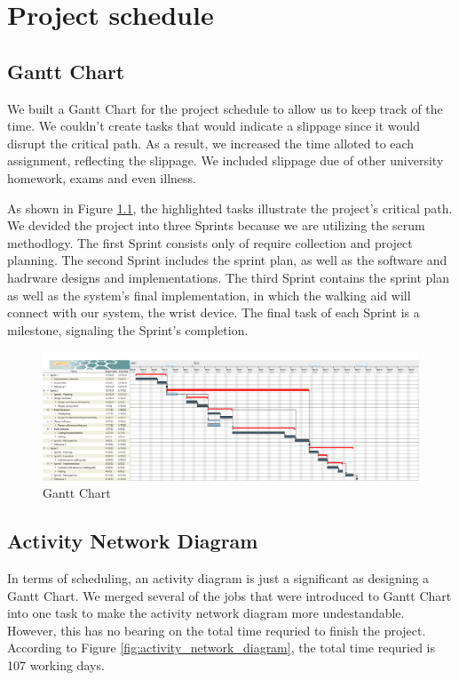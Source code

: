 \chapter{Project schedule}\label{ch:schedule}
    \section{Gantt Chart}

    We built a Gantt Chart for the project schedule to allow us to keep track of the time. We couldn't create tasks that would indicate a slippage since it would disrupt the critical path. As a result, we increased the time alloted to each assignment, reflecting the slippage. We included slippage due of other university homework, exams and even illness.

    As shown in Figure \ref{fig:gantt_chart}, the highlighted tasks illustrate the project's critical path. We devided the project into three Sprints because we are utilizing the scrum methodlogy. The first Sprint consists only of require collection and project planning. The second Sprint includes the sprint plan, as well as the software and hadrware designs and implementations. The third Sprint contains the sprint plan as well as the system's final implementation, in which the walking aid will connect with our system, the wrist device. The final task of each Sprint is a milestone, signaling the Sprint's completion.

    \begin{figure}[H]
      \includegraphics[width=\linewidth]{graphics/Gantt_Chart.png}
      \caption{Gantt Chart}
      \label{fig:gantt_chart}
    \end{figure}

    \section{Activity Network Diagram}

    In terms of scheduling, an activity diagram is just a significant as designing a Gantt Chart. We merged several of the jobs that were introduced to Gantt Chart into one task to make the activity network diagram more undestandable. However, this has no bearing on the total time requried to finish the project. According to Figure \ref{fig:activity_network_diagram}, the total time requried is 107 working days.

